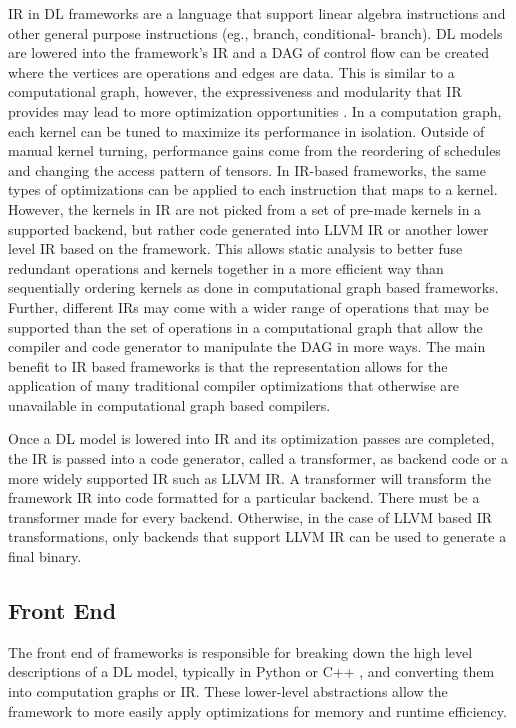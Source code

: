 IR in DL frameworks are a language that support linear algebra instructions and
other general purpose instructions (eg., branch, conditional- branch). DL
models are lowered into the framework's IR and a DAG of control flow
\cite{nGraph} can be created where the vertices are operations and edges are
data. This is similar to a computational graph, however, the expressiveness and
modularity that IR provides may lead to more optimization opportunities
\cite{DLVM}. In a computation graph, each kernel can be tuned to maximize its
performance in isolation. Outside of manual kernel turning, performance gains
come from the reordering of schedules and changing the access pattern of
tensors. In IR-based frameworks, the same types of optimizations can be applied
to each instruction that maps to a kernel. However, the kernels in IR are not
picked from a set of pre-made kernels in a supported backend, but rather code
generated into LLVM IR or another lower level IR based on the framework. This
allows static analysis to better fuse redundant operations and kernels together
in a more efficient way than sequentially ordering kernels as done in
computational graph based frameworks. Further, different IRs may come with
a wider range of operations that may be supported than the set of operations in
a computational graph that allow the compiler and code generator to manipulate
the DAG in more ways. The main benefit to IR based frameworks is that the
representation allows for the application of many traditional compiler
optimizations that otherwise are unavailable in computational graph based
compilers.

Once a DL model is lowered into IR and its optimization passes are completed, the IR
is passed into a code generator, called a transformer, as backend code or a
more widely supported IR such as LLVM IR. A transformer will transform the framework
IR into code formatted for a particular backend. There must be a transformer
made for every backend. Otherwise, in the case of LLVM based IR
transformations, only backends that support LLVM
IR can be used to generate a final binary.

\subsection{Front End}
The front end of frameworks is responsible for breaking down the high level
descriptions of a DL model, typically in Python or C++ \cite{tensorflow}, and
converting them into computation graphs or IR. These lower-level abstractions
allow the framework to more easily apply optimizations for memory and runtime
efficiency. 

